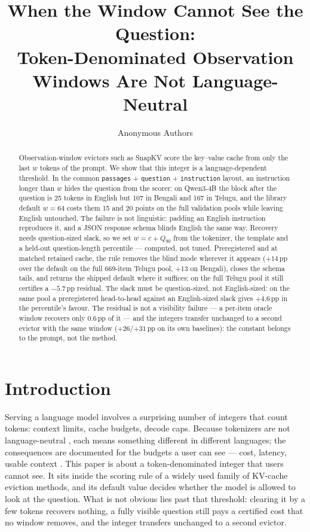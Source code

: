 \documentclass{article}
\title{When the Window Cannot See the Question:\\
Token-Denominated Observation Windows Are Not Language-Neutral}
\author{Anonymous Authors}
\begin{document}
\maketitle

\begin{abstract}
Observation-window evictors such as SnapKV score the key--value cache
from only the last $w$ tokens of the prompt. We show that this integer
is a language-dependent threshold. In the common
\texttt{passages} + \texttt{question} + \texttt{instruction} layout, an
instruction longer than $w$ hides the question from the scorer: on
Qwen3-4B the block after the question is 25 tokens in English but 107 in
Bengali and 167 in Telugu, and the library default $w{=}64$ costs them
15 and 20 points on the full validation pools while leaving English
untouched. The failure is not linguistic: padding an English
instruction reproduces it, and a JSON response schema blinds English
the same way. Recovery needs question-sized slack, so we set
$w = c + Q_{90}$ from the tokenizer, the template and a held-out
question-length percentile --- computed, not tuned. Preregistered and
at matched retained cache, the rule removes the blind mode wherever it
appears ($+14$\,pp over the default on the full 669-item Telugu pool,
$+13$ on Bengali), closes the schema tails, and returns the shipped
default where it suffices; on the full Telugu pool it still certifies
a $-5.7$\,pp residual. The slack must be question-sized, not
English-sized: on the same pool a preregistered head-to-head against
an English-sized slack gives $+4.6$\,pp in the percentile's favour.
The residual is not a
visibility failure --- a per-item oracle window recovers only
$0.6$\,pp of it --- and the integers transfer unchanged to a second
evictor with the same window ($+26$/$+31$\,pp on its own baselines):
the constant belongs to the prompt, not the method.
\end{abstract}

\section{Introduction}

Serving a language model involves a surprising number of integers
that count tokens: context limits, cache budgets, decode caps. Because
tokenizers are not language-neutral \citep{petrov2023language}, each
means something different in different languages; the consequences are
documented for the budgets a user can see --- cost, latency, usable
context \citep{marchisio2024multilingual, marie2025lowbit}. This paper is about a token-denominated integer that
users cannot see. It sits inside the scoring rule of a widely used family
of KV-cache eviction methods, and its default value decides whether the
model is allowed to look at the question. What is not obvious lies past
that threshold: clearing it by a few tokens recovers nothing, a fully
visible question still pays a certified cost that no window removes, and
the integer transfers unchanged to a second evictor.
\end{document}
